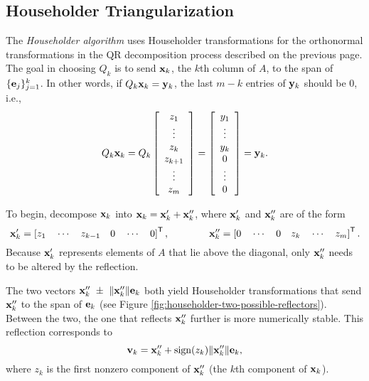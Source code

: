 \subsection*{Householder Triangularization} %

The \emph{Householder algorithm} uses Householder transformations for the orthonormal transformations in the QR decomposition process described on the previous page.
The goal in choosing $Q_k$ is to send $\mathbf{x}_k$, the $k$th column of $A$, to the span of $\{\mathbf{e}_j\}_{j=1}^k$.
In other words, if $Q_k\mathbf{x}_k = \mathbf{y}_k$, the last $m - k$ entries of $\mathbf{y}_k$ should be $0$, i.e.,
\begin{align*}
Q_k\mathbf{x}_k = Q_k
\left[\begin{array}{c}
z_1 \\ \vdots \\ z_k \\ z_{k+1} \\ \vdots \\ z_m
\end{array}\right]
=
\left[\begin{array}{c}
y_1 \\ \vdots \\ y_k \\ 0 \\ \vdots \\ 0
\end{array}\right]
= \mathbf{y}_k.
\end{align*}

To begin, decompose $\mathbf{x}_k$ into $\mathbf{x}_k = \mathbf{x}_k' + \mathbf{x}_k''$, where $\mathbf{x}_k'$ and $\mathbf{x}_k''$ are of the form
\[
\mathbf{x}_k' = \left[z_1\quad \cdots\quad z_{k-1}\quad 0\quad \cdots\quad 0\right]^{\mathsf T},
\qquad\qquad
\mathbf{x}_k'' = \left[0\quad \cdots\quad 0\quad z_k\quad \cdots\quad z_m\right]^{\mathsf T}.
\]
Because $\mathbf{x}_k'$ represents elements of $A$ that lie above the diagonal, only $\mathbf{x}_k''$ needs to be altered by the reflection.

The two vectors $\x_k''\ \pm\ \|\x_k''\|\e_k$ both yield Householder transformations that send $\mathbf{x}_k''$ to the span of $\mathbf{e}_k$ (see Figure \ref{fig:householder-two-possible-reflectors}).
Between the two, the one that reflects $\mathbf{x}_k''$ further is more numerically stable.
This reflection corresponds to \[\mathbf{v}_k = \mathbf{x}_k'' + \operatorname{sign}(z_k)\|\mathbf{x}_k''\| \mathbf{e}_k,\] where $z_k$ is the first nonzero component of $\mathbf{x}_k''$ (the $k$th component of $\mathbf{x}_k$).

